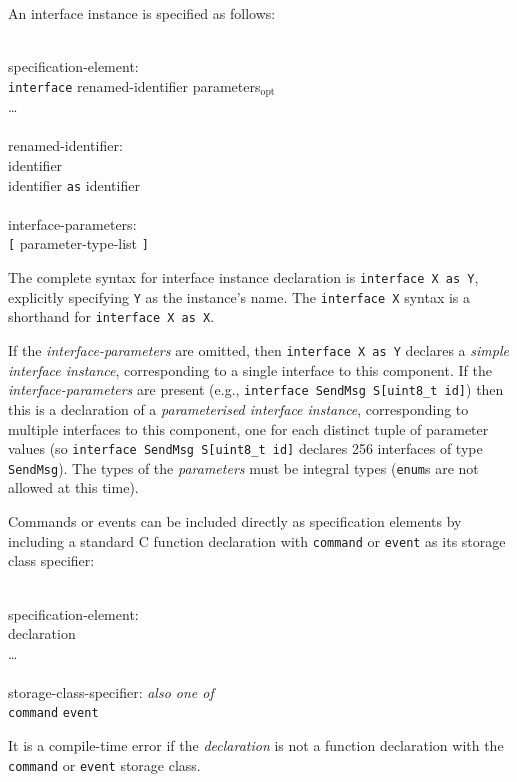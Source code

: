 \documentclass[11pt]{article}
\newcommand{\kw}[1]{{\tt #1}}
\newcommand{\code}[1]{{\tt #1}}
\newcommand{\opt}{$_{\mbox{opt}}$\xspace}
\begin{document}
An interface instance is specified as follows:
\em \begin{tabbing}
\hspace*{2cm}\= \\ \kill
specification-element:\\
\>	\kw{interface} renamed-identifier parameters\opt\\
\>	\ldots\\
\\
renamed-identifier:\\
\>	identifier\\
\>	identifier \kw{as} identifier\\
\\
interface-parameters:\\
\>	\kw{[} parameter-type-list \kw{]}
\end{tabbing} \rm

The complete syntax for interface instance declaration is \code{interface X
as Y}, explicitly specifying \code{Y} as the instance's name. The
\code{interface X} syntax is a shorthand for \code{interface X as X}.

If the \emph{interface-parameters} are omitted, then \code{interface X as
Y} declares a \emph{simple interface instance}, corresponding to a single
interface to this component. If the \emph{interface-parameters} are present
(e.g., \code{interface SendMsg S[uint8\_t id]}) then this is a declaration
of a \emph{parameterised interface instance}, corresponding to multiple
interfaces to this component, one for each distinct tuple of parameter
values (so \code{interface SendMsg S[uint8\_t id]} declares 256 interfaces
of type \code{SendMsg}). The types of the \emph{parameters} must be
integral types (\kw{enum}s are not allowed at this time).

Commands or events can be included directly as specification elements by
including a standard C function declaration with
\kw{command} or \kw{event} as its storage class specifier:
\em \begin{tabbing}
\hspace*{2cm}\= \\ \kill
specification-element:\\
\>	declaration\\
\>	\ldots\\
\\
storage-class-specifier: \emph{also one of}\\
\>	\kw{command} \kw{event}\\
\end{tabbing} \rm
It is a compile-time error if the \emph{declaration} is not a function
declaration with the \kw{command} or \kw{event} storage class. 
\end{document}
